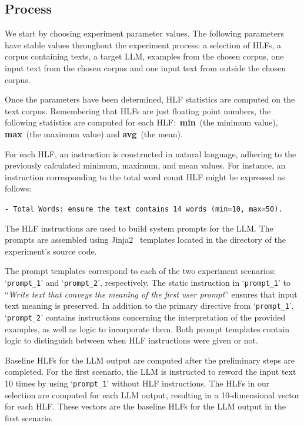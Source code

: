 \documentclass[a4paper,twoside]{article}
\begin{document}
\subsection{Process}\label{subsec:experiment-process}

We start by choosing experiment parameter values.
The following parameters have stable values throughout the experiment process: a
selection of HLFs, a corpus containing texts, a target LLM, examples from the
chosen corpus, one input text from the chosen corpus and one input text from
outside the chosen corpus.

Once the parameters have been determined, HLF statistics are computed on the
text corpus.
Remembering that HLFs are just floating point numbers, the following statistics
are computed for each HLF:~\textbf{min}~(the minimum value), \textbf{max}~(the
maximum value) and \textbf{avg}~(the mean).

For each HLF, an instruction is constructed in natural language, adhering to the
previously calculated minimum, maximum, and mean values. For instance, an
instruction corresponding to the total word count HLF might be expressed as
follows:

\texttt{- Total Words: ensure the text contains 14 words (min=10, max=50).}

The HLF instructions are used to build system prompts for the LLM.\@
The prompts are assembled using Jinja2~\cite{jinja2} templates located in the
\texttt{}
directory of the experiment's source code.

The prompt templates correspond to each of the two experiment scenarios:
`\texttt{prompt\_1}' and `\texttt{prompt\_2}', respectively.
The static instruction in `\texttt{prompt\_1}' to ``\textit{Write text that
conveys the meaning of the first user prompt}'' ensures that input text meaning
is preserved.
In addition to the primary directive from `\texttt{prompt\_1}',
`\texttt{prompt\_2}' contains instructions concerning the interpretation of the
provided examples, as well as logic to incorporate them.
Both prompt templates contain logic to distinguish between when HLF instructions
were given or not.

Baseline HLFs for the LLM output are computed after the preliminary steps are
completed.
For the first scenario, the LLM is instructed to reword the input text 10 times
by using `\texttt{prompt\_1}' without HLF instructions.
The HLFs in our selection are computed for each LLM output, resulting in a
10-dimensional vector for each HLF.\@
These vectors are the baseline HLFs for the LLM output in the first scenario.
\end{document}
